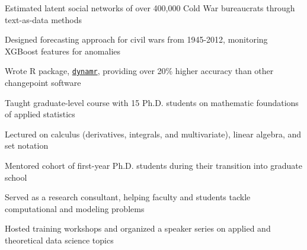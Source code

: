 \documentclass[]{deedy-resume-openfont}
\begin{document}
\begin{flushleft}
 \hspace{3.375in} 
\vspace{-1.1em}
\begin{tightemize}
    \item Estimated latent social networks of over 400,000 Cold War bureaucrats through text-as-data methods
    \item Designed forecasting approach for civil wars from 1945-2012, monitoring XGBoost features for anomalies
    \item Wrote R package, \texttt{\href{http://github.com/dnkent/dynamr}{dynamr}}, providing over 20\% higher accuracy than other changepoint software %
\end{tightemize}
\sectionsep

 \hspace{2.325in} 
\begin{tightemize}
    \item Taught graduate-level course with 15 Ph.D. students on mathematic foundations of applied statistics
    \item Lectured on calculus (derivatives, integrals, and multivariate), linear algebra, and set notation
    \item Mentored cohort of first-year Ph.D. students during their transition into graduate school
\end{tightemize}
\sectionsep

\hspace{1.33in} 
\begin{tightemize}
\item Served as a research consultant, helping faculty and students tackle computational and modeling problems
\item Hosted training workshops and organized a speaker series on applied and theoretical data science topics
\end{tightemize}
\sectionsep


\end{flushleft}
\end{document}
